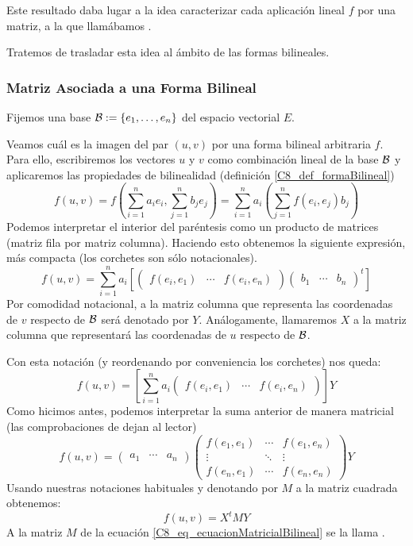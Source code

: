 Este resultado daba lugar a la idea caracterizar cada aplicación lineal $f$ por una matriz, a la que llamábamos .

Tratemos de trasladar esta idea al ámbito de las formas bilineales.
\subsubsection{Matriz Asociada a una Forma Bilineal}
Fijemos una base $\mathcal{B}:=\{e_1,\dots,e_n\}$ del espacio vectorial $E$.

Veamos cuál es la imagen del par $(u,v)$ por una forma bilineal arbitraria $f$. Para ello, escribiremos los vectores $u$ y $v$ como combinación lineal de la base $\mathcal{B}$ y aplicaremos las propiedades de bilinealidad (definición \ref{C8_def_formaBilineal})
\[f(u,v)=f\left(\sum_{i=1}^{n}a_ie_i,\sum_{j=1}^{n}b_je_j\right)=\sum_{i=1}^{n}a_i\left(\sum_{j=1}^{n}f(e_i,e_j)b_j\right)\]
Podemos interpretar el interior del paréntesis como un producto de matrices (matriz fila por matriz columna). Haciendo esto obtenemos la siguiente expresión, más compacta (los corchetes son sólo notacionales).
\[f(u,v)=\sum_{i=1}^{n}a_i\left[\begin{pmatrix}
f(e_i, e_1) & 
\cdots &
f(e_i, e_n)
\end{pmatrix}\begin{pmatrix}
b_1 & \cdots & b_n
\end{pmatrix}^t\right]\]
Por comodidad notacional, a la matriz columna que representa las coordenadas de $v$ respecto de $\mathcal{B}$ será denotado por $Y$. Análogamente, llamaremos $X$ a la matriz columna que representará las coordenadas de $u$ respecto de $\mathcal{B}$.

Con esta notación (y reordenando por conveniencia los corchetes) nos queda:
\[f(u,v)=\left[\sum_{i=1}^{n}a_i\begin{pmatrix}
f(e_i, e_1) & 
\cdots &
f(e_i, e_n)
\end{pmatrix}\right]Y\]
Como hicimos antes, podemos interpretar la suma anterior de manera matricial (las comprobaciones de dejan al lector)
\[f(u,v)=\begin{pmatrix}
a_1 & \cdots & a_n
\end{pmatrix}\begin{pmatrix}
f(e_1, e_1) & \cdots & f(e_1,e_n)\\
\vdots & \ddots & \vdots\\
f(e_n,e_1) & \cdots & f(e_n,e_n)
\end{pmatrix}Y\]
Usando nuestras notaciones habituales y denotando por $M$ a la matriz cuadrada obtenemos:
\begin{equation}
\label{C8_eq_ecuacionMatricialBilineal}
f(u,v)=X^tMY
\end{equation}
A la matriz $M$ de la ecuación \eqref{C8_eq_ecuacionMatricialBilineal} se la llama .


